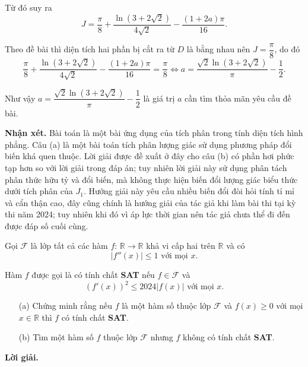 \begin{enumerate}
{    Từ đó suy ra $$J = \dfrac{\pi}{8} + \dfrac{\ln(3 + 2\sqrt{2})}{4\sqrt{2}} - \dfrac{(1+2a)\pi}{16}.$$

    Theo đề bài thì diện tích hai phần bị cắt ra từ $D$ là bằng nhau nên $J = \dfrac{\pi}{8}$, do đó $$\dfrac{\pi}{8} + \dfrac{\ln(3 + 2\sqrt{2})}{4\sqrt{2}} - \dfrac{(1+2a)\pi}{16} = \dfrac{\pi}{8} \iff a = \dfrac{\sqrt{2}\ln(3+2\sqrt{2})}{\pi} - \dfrac{1}{2}.$$

    Như vậy $a = \dfrac{\sqrt{2}\ln(3+2\sqrt{2})}{\pi} - \dfrac{1}{2}$ là giá trị $a$ cần tìm thỏa mãn yêu cầu đề bài.}
\end{enumerate}

\textbf{Nhận xét. }Bài toán là một bài ứng dụng của tích phân trong tính diện tích hình phẳng. Câu (a) là một bài toán tích phân lượng giác sử dụng phương pháp đổi biến khá quen thuộc. Lời giải được đề xuất ở đây cho câu (b) có phần hơi phức tạp hơn so với lời giải trong đáp án; tuy nhiên lời giải này sử dụng phân tách phân thức hữu tỷ và đổi biến, mà không thực hiện biến đổi lượng giác biểu thức dưới tích phân của $J_1$. Hướng giải này yêu cầu nhiều biến đổi đòi hỏi tính tỉ mỉ và cẩn thận cao, đây cũng chính là hướng giải của tác giả khi làm bài thi tại kỳ thi năm 2024; tuy nhiên khi đó vì áp lực thời gian nên tác giả chưa thể đi đến được đáp số cuối cùng.

\begin{tcolorbox}[title=\textbf{Bài toán A.4.},breakable]
    Gọi $\mathcal{F}$ là lớp tất cả các hàm $f:\,\mathbb{R}\to \mathbb{R}$ khả vi cấp hai trên $\mathbb{R}$ và có $$|f''(x)| \leq 1 \text{ với mọi }x.$$

    Hàm $f$ được gọi là có tính chất \textbf{SAT} nếu $f \in \mathcal{F}$ và $$(f'(x))^2 \leq 2024|f(x)|\text{ với mọi }x.$$

    \begin{enumerate}
        \item[(a)] {Chứng minh rằng nếu $f$ là một hàm số thuộc lớp $\mathcal{F}$ và $f(x) \geq 0$ với mọi $x \in \mathbb{R}$ thì $f$ có tính chất \textbf{SAT}.}
        \item[(b)] {Tìm một hàm số $f$ thuộc lớp $\mathcal{F}$ nhưng $f$ không có tính chất \textbf{SAT}.}  
    \end{enumerate}
\end{tcolorbox}

\textbf{Lời giải. }


